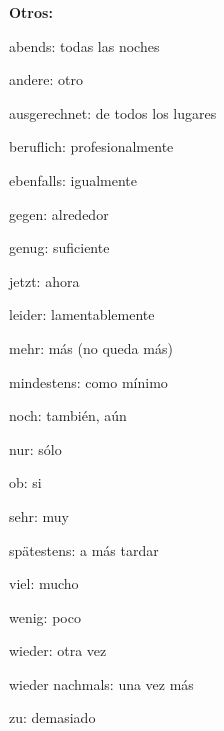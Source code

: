 \textbf{Otros:}
\begin{multicols}{3}
\begin{myitemize}
\item abends: todas las noches
\item andere: otro
\item ausgerechnet: de todos los lugares
\item beruflich: profesionalmente
\item ebenfalls: igualmente
\item gegen: alrededor
\item genug: suficiente
\item jetzt: ahora
\item leider: lamentablemente
\item mehr: más (no queda más)
\item mindestens: como mínimo
\item noch: también, aún
\item nur: sólo
\item ob: si
\item sehr: muy
\item spätestens: a más tardar
\item viel: mucho
\item wenig: poco
\item wieder: otra vez
\item wieder nachmals: una vez más
\item zu: demasiado
\end{myitemize}
\end{multicols}


